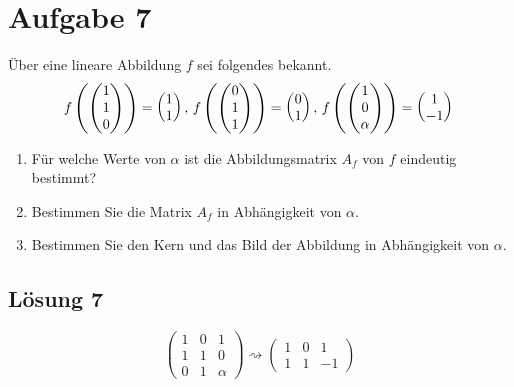 \documentclass[main.tex]{subfiles}
\begin{document}
\arraycolsep=1pt
\section{Aufgabe 7}
Über eine lineare Abbildung $f$ sei folgendes bekannt.
$$
    f\left(\begin{pmatrix}
        1 \\ 1 \\ 0
    \end{pmatrix}\right) = \begin{pmatrix}
        1 \\ 1
    \end{pmatrix},\,
    f\left(\begin{pmatrix}
        0 \\ 1 \\ 1
    \end{pmatrix}\right) = \begin{pmatrix}
        0 \\ 1
    \end{pmatrix},\,
    f\left(\begin{pmatrix}
        1 \\ 0 \\ \alpha
    \end{pmatrix}\right) = \begin{pmatrix}
        1 \\ -1
    \end{pmatrix}\\
    $$

\begin{enumerate}
    \item Für welche Werte von $\alpha$ ist die Abbildungsmatrix $A_f$ von $f$ eindeutig bestimmt?
    \item Bestimmen Sie die Matrix $A_f$ in Abhängigkeit von $\alpha$.
    \item Bestimmen Sie den Kern und das Bild der Abbildung in Abhängigkeit von $\alpha$.
\end{enumerate}

\subsection{Lösung 7}
$$
    \begin{pmatrix}
        1 & 0 & 1 \\
        1 & 1 & 0 \\
        0 & 1 & \alpha 
    \end{pmatrix}
    \rightsquigarrow 
    \begin{pmatrix}
        1 & 0 & 1 \\
        1 & 1 & -1
    \end{pmatrix}
$$
\end{document}
